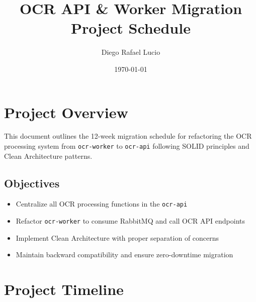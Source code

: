 \documentclass[11pt,a4paper]{article}
\title{\textbf{OCR API \& Worker Migration Project Schedule}}
\author{Diego Rafael Lucio}
\date{\today}
\begin{document}
\maketitle

\section{Project Overview}

This document outlines the 12-week migration schedule for refactoring the OCR processing system from \texttt{ocr-worker} to \texttt{ocr-api} following SOLID principles and Clean Architecture patterns.

\subsection{Objectives}
\begin{itemize}
    \item Centralize all OCR processing functions in the \texttt{ocr-api}
    \item Refactor \texttt{ocr-worker} to consume RabbitMQ and call OCR API endpoints
    \item Implement Clean Architecture with proper separation of concerns
    \item Maintain backward compatibility and ensure zero-downtime migration
\end{itemize}

\section{Project Timeline}
\end{document}
